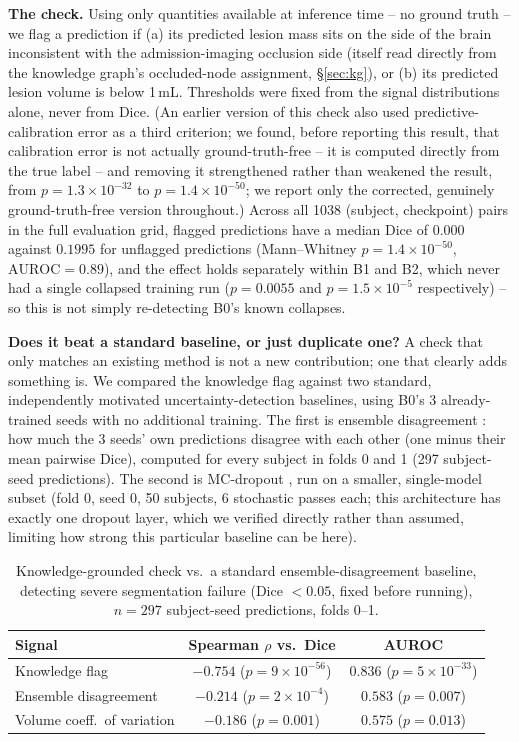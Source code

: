 \documentclass[conference]{IEEEtran}
\begin{document}
\textbf{The check.} Using only quantities available at inference time -- no ground truth -- we flag a prediction if (a) its predicted lesion mass sits on the side of the brain inconsistent with the admission-imaging occlusion side (itself read directly from the knowledge graph's occluded-node assignment, \S\ref{sec:kg}), or (b) its predicted lesion volume is below 1\,mL. Thresholds were fixed from the signal distributions alone, never from Dice. (An earlier version of this check also used predictive-calibration error as a third criterion; we found, before reporting this result, that calibration error is not actually ground-truth-free -- it is computed directly from the true label -- and removing it strengthened rather than weakened the result, from $p=1.3\times10^{-32}$ to $p=1.4\times10^{-50}$; we report only the corrected, genuinely ground-truth-free version throughout.) Across all 1038 (subject, checkpoint) pairs in the full evaluation grid, flagged predictions have a median Dice of $0.000$ against $0.1995$ for unflagged predictions (Mann--Whitney $p=1.4\times10^{-50}$, $\mathrm{AUROC}=0.89$), and the effect holds separately within B1 and B2, which never had a single collapsed training run ($p=0.0055$ and $p=1.5\times10^{-5}$ respectively) -- so this is not simply re-detecting B0's known collapses.

\textbf{Does it beat a standard baseline, or just duplicate one?} A check that only matches an existing method is not a new contribution; one that clearly adds something is. We compared the knowledge flag against two standard, independently motivated uncertainty-detection baselines, using B0's 3 already-trained seeds with no additional training. The first is ensemble disagreement \cite{lakshminarayanan2017}: how much the 3 seeds' own predictions disagree with each other (one minus their mean pairwise Dice), computed for every subject in folds 0 and 1 (297 subject-seed predictions). The second is MC-dropout \cite{gal2016dropout}, run on a smaller, single-model subset (fold 0, seed 0, 50 subjects, 6 stochastic passes each; this architecture has exactly one dropout layer, which we verified directly rather than assumed, limiting how strong this particular baseline can be here).

\begin{table}[t]
\centering
\caption{Knowledge-grounded check vs.\ a standard ensemble-disagreement baseline, detecting severe segmentation failure (Dice $<0.05$, fixed before running), $n=297$ subject-seed predictions, folds 0--1.}
\label{tab:faildetect}
\begin{tabular}{lcc}
\toprule
\textbf{Signal} & \textbf{Spearman $\rho$ vs.\ Dice} & \textbf{AUROC} \\
\midrule
Knowledge flag & $-0.754$ ($p=9\times10^{-56}$) & $\mathbf{0.836}$ ($p=5\times10^{-33}$) \\
Ensemble disagreement & $-0.214$ ($p=2\times10^{-4}$) & $0.583$ ($p=0.007$) \\
Volume coeff.\ of variation & $-0.186$ ($p=0.001$) & $0.575$ ($p=0.013$) \\
\bottomrule
\end{tabular}
\end{table}
\end{document}

